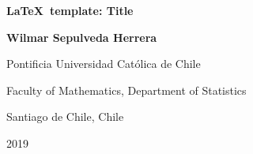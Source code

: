 \thispagestyle{empty}

\begin{center}
\begin{figure}
\centering
{}
\end{figure}\vspace*{2.0cm}

\textbf{\huge \LaTeX\ template: Title}\vspace*{4.0cm}

\Large\textbf{Wilmar Sepulveda Herrera}\vspace*{4.0cm}

\small Pontificia Universidad Cat\'{o}lica de Chile

Faculty of Mathematics, Department of Statistics

Santiago de Chile, Chile

2019
\end{center}

\newpage{\pagestyle{empty}\cleardoublepage}

\newpage

\thispagestyle{empty}

